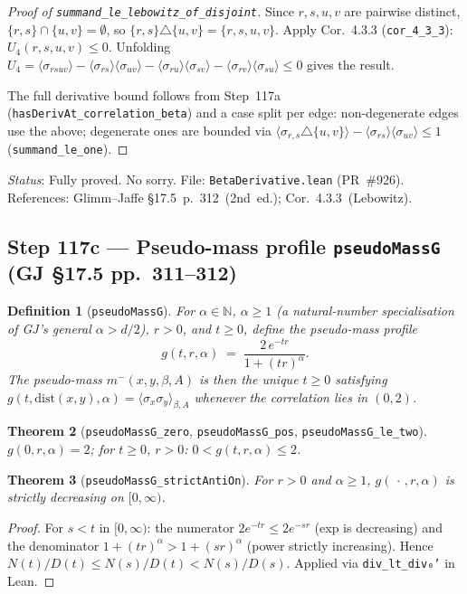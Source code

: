 \documentclass[a4paper,11pt]{article}
\newtheorem{theorem}{Theorem}
\newtheorem{definition}[theorem]{Definition}
\begin{document}
\begin{proof}[Proof of \texttt{summand\_le\_lebowitz\_of\_disjoint}]
Since $r,s,u,v$ are pairwise distinct, $\{r,s\}\cap\{u,v\}=\emptyset$, so
$\{r,s\}\triangle\{u,v\}=\{r,s,u,v\}$.
Apply Cor.~4.3.3 (\texttt{cor\_4\_3\_3}): $U_4(r,s,u,v)\le 0$.
Unfolding $U_4 = \langle\sigma_{rsuv}\rangle - \langle\sigma_{rs}\rangle\langle\sigma_{uv}\rangle
- \langle\sigma_{ru}\rangle\langle\sigma_{sv}\rangle - \langle\sigma_{rv}\rangle\langle\sigma_{su}\rangle\le 0$
gives the result.

The full derivative bound follows from Step~117a (\texttt{hasDerivAt\_correlation\_beta})
and a case split per edge: non-degenerate edges use the above; degenerate ones
are bounded via $\langle\sigma_{r,s}\triangle\{u,v\}\rangle - \langle\sigma_{rs}\rangle\langle\sigma_{uv}\rangle\le 1$
(\texttt{summand\_le\_one}).
\end{proof}

\noindent\textit{Status}: Fully proved. No sorry.
File: \texttt{BetaDerivative.lean} (PR~\#926).
References: Glimm--Jaffe \S17.5~p.~312~(2nd~ed.); Cor.~4.3.3~(Lebowitz).

\subsection*{Step 117c — Pseudo-mass profile \texttt{pseudoMassG} (GJ \S17.5 pp.~311--312)}

\begin{definition}[\texttt{pseudoMassG}]
For $\alpha \in \mathbb{N}$, $\alpha \ge 1$ (a natural-number specialisation of GJ's general $\alpha > d/2$),
$r > 0$, and $t \ge 0$, define the pseudo-mass profile
\[
  g(t, r, \alpha) \;=\; \frac{2\,e^{-tr}}{1 + (tr)^{\alpha}}.
\]
The pseudo-mass $m^-(x,y,\beta,A)$ is then the unique $t \ge 0$ satisfying
$g(t, \mathrm{dist}(x,y), \alpha) = \langle\sigma_x\sigma_y\rangle_{\beta,A}$ whenever the
correlation lies in $(0,2)$.
\end{definition}

\begin{theorem}[\texttt{pseudoMassG\_zero}, \texttt{pseudoMassG\_pos}, \texttt{pseudoMassG\_le\_two}]
$g(0,r,\alpha) = 2$; for $t \ge 0$, $r > 0$: $0 < g(t,r,\alpha) \le 2$.
\end{theorem}

\begin{theorem}[\texttt{pseudoMassG\_strictAntiOn}]
For $r > 0$ and $\alpha \ge 1$, $g(\,\cdot\,,r,\alpha)$ is strictly decreasing on $[0,\infty)$.
\end{theorem}
\begin{proof}
For $s < t$ in $[0,\infty)$: the numerator $2e^{-tr} \le 2e^{-sr}$ (exp is decreasing)
and the denominator $1+(tr)^\alpha > 1+(sr)^\alpha$ (power strictly increasing).
Hence $N(t)/D(t) \le N(s)/D(t) < N(s)/D(s)$.
Applied via \texttt{div\_lt\_div₀'} in Lean.
\end{proof}
\end{document}
